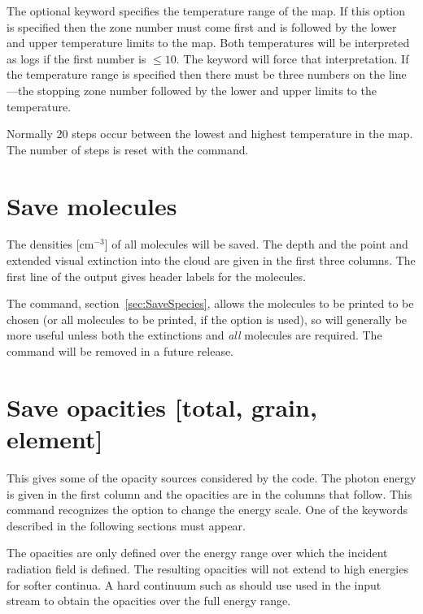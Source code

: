 The optional keyword  specifies the temperature range of the map.
If this option is specified then the zone number must come first and is
followed by the lower and upper temperature limits to the map.
Both
temperatures will be interpreted as logs if the first number is $\leq 10$.
The keyword  will force that interpretation.  If the temperature range
is specified then there must be three numbers on the line---the stopping
zone number followed by the lower and upper limits to the temperature.

Normally 20 steps occur between the lowest and highest temperature in
the map.
The number of steps is reset with the  command.

\section{Save molecules}

The densities [cm$^{-3}$] of all molecules will be saved.  The depth and
the point and extended visual extinction into the cloud are given in the
first three columns.  The first line of the output gives header labels for
the molecules.

The  command, section~\ref{sec:SaveSpecies},
allows the molecules to be printed to be chosen (or all molecules to
be printed, if the  option is used), so will generally
be more useful unless both the extinctions and {\em all}\/ molecules
are required.  The  command will be removed
in a future release.

\section{Save opacities [total, grain, element]}

This gives some of the opacity sources considered by the code. The photon
energy is given in the first column and the opacities are in the columns that
follow. This command recognizes the  option to change the
energy scale. One of the keywords described in the following sections must
appear.

The opacities are only defined over the energy range over which the incident
radiation field is defined. The resulting opacities will not extend to high energies
for softer continua. A hard continuum such as  should use
used in the input stream to obtain the opacities over the full energy range.

